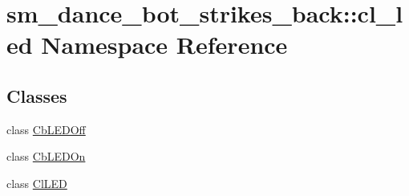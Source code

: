 \hypertarget{namespacesm__dance__bot__strikes__back_1_1cl__led}{}\section{sm\+\_\+dance\+\_\+bot\+\_\+strikes\+\_\+back\+:\+:cl\+\_\+led Namespace Reference}
\label{namespacesm__dance__bot__strikes__back_1_1cl__led}
\subsection*{Classes}
\begin{DoxyCompactItemize}
\item 
class \hyperlink{classsm__dance__bot__strikes__back_1_1cl__led_1_1CbLEDOff}{Cb\+L\+E\+D\+Off}
\item 
class \hyperlink{classsm__dance__bot__strikes__back_1_1cl__led_1_1CbLEDOn}{Cb\+L\+E\+D\+On}
\item 
class \hyperlink{classsm__dance__bot__strikes__back_1_1cl__led_1_1ClLED}{Cl\+L\+ED}
\end{DoxyCompactItemize}
